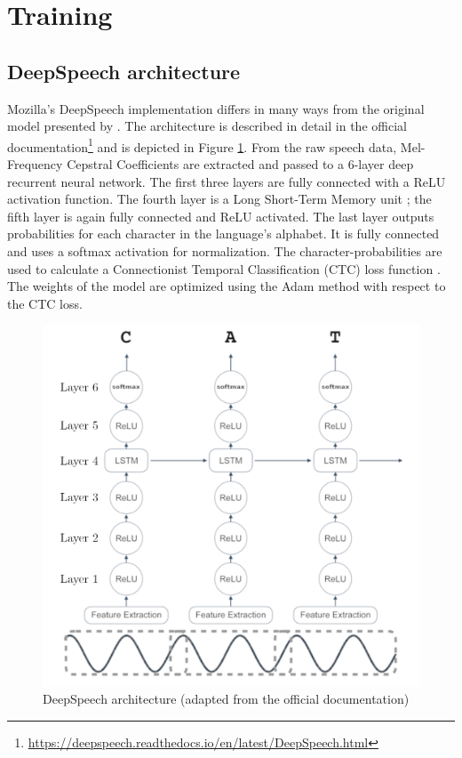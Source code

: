 \documentclass[12pt]{article}    %
\begin{document}
\section{Training}
\subsection{DeepSpeech architecture}
Mozilla's DeepSpeech implementation differs in many ways from the original model presented by \textcite{hannun2014deep}. The architecture is described in detail in the official documentation\footnote{\url{https://deepspeech.readthedocs.io/en/latest/DeepSpeech.html}} and is depicted in Figure \ref{fig:ds}. From the raw speech data, Mel-Frequency Cepstral Coefficients \parencite{imai1983cepstral} are extracted and passed to a 6-layer deep recurrent neural network. The first three layers are fully connected with a ReLU activation function. The fourth layer is a Long Short-Term Memory unit \parencite{hochreiter1997long}; the fifth layer is again fully connected and ReLU activated. The last layer outputs probabilities for each character in the language's alphabet. It is fully connected and uses a softmax activation for normalization. The character-probabilities are used to calculate a Connectionist Temporal Classification (CTC) loss function \parencite{graves2006connectionist}. The weights of the model are optimized using the Adam method \parencite{kingma2014adam} with respect to the CTC loss.

\begin{figure}[ht]
    \centering
    \includegraphics[width=.85\textwidth]{ds.png}
    \caption{DeepSpeech architecture (adapted from the official documentation\protect\footnotemark[\value{footnote}])}
    \label{fig:ds}
\end{figure}
\end{document}
